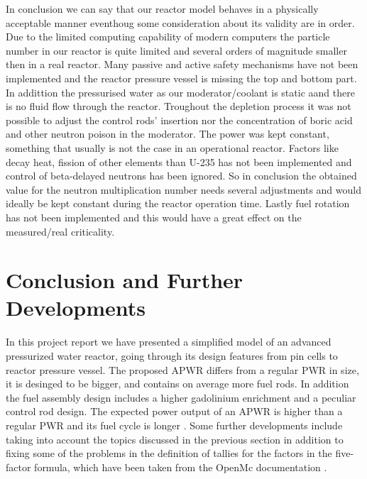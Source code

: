 \documentclass[twocolumn,a4paper,10pt]{article}
\begin{document}
In conclusion we can say that our reactor model behaves in a physically acceptable manner eventhoug some consideration about its validity are in order. Due to the limited computing capability of modern computers the particle number in our reactor is quite limited and several orders of magnitude smaller then in a real reactor. Many passive and active safety mechanisms have not been implemented and the reactor pressure vessel is missing the top and bottom part. In addittion the pressurised water as our moderator/coolant is static aand there is no fluid flow through the reactor. Troughout the depletion process it was not possible to adjust the control rods' insertion nor the concentration of boric acid and other neutron poison in the moderator. The power was kept constant, something that usually is not the case in an operational reactor. Factors like decay heat, fission of other elements than U-235 has not been implemented and control of beta-delayed neutrons has been ignored. So in conclusion the obtained value for the neutron multiplication number needs several adjustments and would ideally be kept constant during the reactor operation time. Lastly fuel rotation has not been implemented and this would have a great effect on the measured/real criticality. 


\section[Conclusion and Further Developments]{Conclusion and \newline Further Developments}
\label{sec:Conclusion}

In this project report we have presented a simplified model of an advanced pressurized water reactor, going through its design features from pin cells to reactor pressure vessel. The proposed APWR differs from a regular PWR in size, it is desinged to be bigger, and contains on average more fuel rods. In addition the fuel assembly design includes a higher gadolinium enrichment and a peculiar control rod design. The expected power output of an APWR is higher than a regular PWR and its fuel cycle is longer \cite{APWR}. Some further developments include taking into account the topics discussed in the previous section in addition to fixing some of the problems in the definition of tallies for the factors in the five-factor formula, which have been taken from the OpenMc documentation \cite{DocumentationPinCell,DocumentationDepletion}. 
\end{document}

